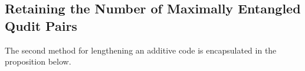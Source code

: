 \documentclass{article}
\DeclareMathOperator{\Tr}{Tr}
\DeclareMathOperator{\rank}{rank}
\newtheorem{thm}{Theorem}[section]
\theoremstyle{remark}
\theoremstyle{definition}
\numberwithin{equation}{section}
\begin{document}
%
%
%
%

\subsection{Retaining the Number of Maximally Entangled Qudit Pairs} \label{subsec:same}

The second method for lengthening an additive code is encapsulated in the proposition below.
\end{document}
